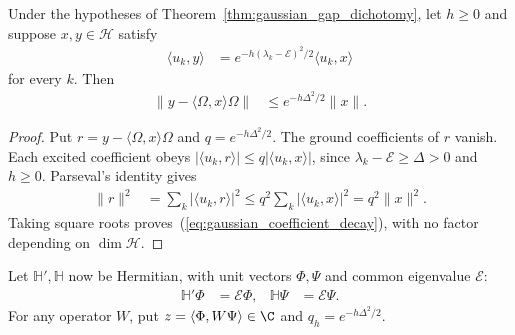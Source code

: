 \begin{theorem}
    \label{thm:gaussian_coefficient_decay}
    \leanok
    Under the hypotheses of Theorem~\ref{thm:gaussian_gap_dichotomy},
    let $h\ge0$ and suppose $x,y\in\mathcal H$ satisfy
    \begin{align}
        \langle u_k,y\rangle
            &=e^{-h(\lambda_k-\mathcal E)^2/2}\langle u_k,x\rangle
        \label{eq:gaussian_spectral_coefficients}
    \end{align}
    for every $k$. Then
    \begin{align}
        \|y-\langle\Omega,x\rangle\Omega\|
            &\le e^{-h\Delta^2/2}\|x\|.
        \label{eq:gaussian_coefficient_decay}
    \end{align}
\end{theorem}
\begin{proof}\leanok
    Put $r=y-\langle\Omega,x\rangle\Omega$ and
    $q=e^{-h\Delta^2/2}$. The ground coefficients of $r$ vanish.
    Each excited coefficient obeys
    $|\langle u_k,r\rangle|\le q|\langle u_k,x\rangle|$, since
    $\lambda_k-\mathcal E\ge\Delta>0$ and $h\ge0$.
    Parseval's identity gives
    \begin{align}
        \|r\|^2
            &=\sum_k|\langle u_k,r\rangle|^2
            \le q^2\sum_k|\langle u_k,x\rangle|^2
            =q^2\|x\|^2.
        \label{eq:gaussian_parseval}
    \end{align}
    Taking square roots proves~(\ref{eq:gaussian_coefficient_decay}),
    with no factor depending on $\dim\mathcal H$.
\end{proof}

Let $\mathbb H',\mathbb H$ now be Hermitian, with unit vectors
$\Phi,\Psi$ and common eigenvalue $\mathcal E$:
\begin{align}
    \mathbb H'\Phi&=\mathcal E\Phi, &
    \mathbb H\Psi&=\mathcal E\Psi.
    \label{eq:gaussian_ground_vectors}
\end{align}
For any operator $W$, put $z=\langle\Phi,W\Psi\rangle\in\C$ and
$q_h=e^{-h\Delta^2/2}$.

